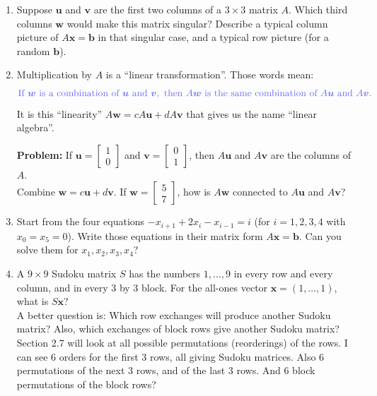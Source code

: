 \documentclass[14pt, a4paper]{article}
\begin{document}
\begin{enumerate}
    \item Suppose $\boldsymbol{u}$ and $\boldsymbol{v}$ are the first two columns of a $3 \times 3$ matrix $A$. Which third columns $\boldsymbol{w}$ would make this matrix singular? Describe a typical column picture of $A\boldsymbol{x} = \boldsymbol{b}$ in that singular case, and a typical row picture (for a random $\boldsymbol{b}$).

    \item Multiplication by $A$ is a ``linear transformation''. Those words mean:
          \[
              \color{blue!60!white}\text{If } \boldsymbol{w} \text{ is a combination of } \boldsymbol{u} \text{ and } \boldsymbol{v}, \text{ then } A\boldsymbol{w} \text{ is the same combination of } A\boldsymbol{u} \text{ and } A\boldsymbol{v}.
          \]
          It is this ``linearity'' $A\boldsymbol{w} = cA\boldsymbol{u} + dA\boldsymbol{v}$ that gives us the name ``linear algebra''.

          \medskip
          \textbf{Problem:} If $\boldsymbol{u} = \begin{bmatrix} 1 \\ 0 \end{bmatrix}$ and $\boldsymbol{v} = \begin{bmatrix} 0 \\ 1 \end{bmatrix}$, then $A\boldsymbol{u}$ and $A\boldsymbol{v}$ are the columns of $A$. \\
          Combine $\boldsymbol{w} = c\boldsymbol{u} + d\boldsymbol{v}$. If $\boldsymbol{w} = \begin{bmatrix} 5 \\ 7 \end{bmatrix}$, how is $A\boldsymbol{w}$ connected to $A\boldsymbol{u}$ and $A\boldsymbol{v}$?

    \item Start from the four equations $-x_{i+1} + 2x_i - x_{i-1} = i$ (for $i = 1,2,3,4$ with $x_0 = x_5 = 0$). Write those equations in their matrix form $A\boldsymbol{x} = \boldsymbol{b}$. Can you solve them for $x_1, x_2, x_3, x_4$?

    \item A $9 \times 9$ Sudoku matrix $S$ has the numbers $1,\dots,9$ in every row and every column, and in every $3$ by $3$ block. For the all-ones vector $\boldsymbol{x} = (1,\dots,1)$, what is $S\boldsymbol{x}$? \\
          A better question is: Which row exchanges will produce another Sudoku matrix? Also, which exchanges of block rows give another Sudoku matrix? \\
          Section 2.7 will look at all possible permutations (reorderings) of the rows. I can see 6 orders for the first 3 rows, all giving Sudoku matrices. Also 6 permutations of the next 3 rows, and of the last 3 rows. And 6 block permutations of the block rows?
\end{enumerate}
\end{document}
